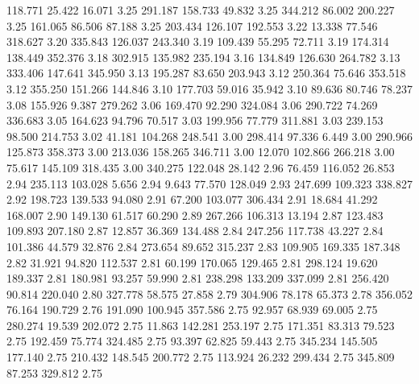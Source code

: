  118.771   25.422   16.071         3.25
 291.187  158.733   49.832         3.25
 344.212   86.002  200.227         3.25
 161.065   86.506   87.188         3.25
 203.434  126.107  192.553         3.22
  13.338   77.546  318.627         3.20
 335.843  126.037  243.340         3.19
 109.439   55.295   72.711         3.19
 174.314  138.449  352.376         3.18
 302.915  135.982  235.194         3.16
 134.849  126.630  264.782         3.13
 333.406  147.641  345.950         3.13
 195.287   83.650  203.943         3.12
 250.364   75.646  353.518         3.12
 355.250  151.266  144.846         3.10
 177.703   59.016   35.942         3.10
  89.636   80.746   78.237         3.08
 155.926    9.387  279.262         3.06
 169.470   92.290  324.084         3.06
 290.722   74.269  336.683         3.05
 164.623   94.796   70.517         3.03
 199.956   77.779  311.881         3.03
 239.153   98.500  214.753         3.02
  41.181  104.268  248.541         3.00
 298.414   97.336    6.449         3.00
 290.966  125.873  358.373         3.00
 213.036  158.265  346.711         3.00
  12.070  102.866  266.218         3.00
  75.617  145.109  318.435         3.00
 340.275  122.048   28.142         2.96
  76.459  116.052   26.853         2.94
 235.113  103.028    5.656         2.94
   9.643   77.570  128.049         2.93
 247.699  109.323  338.827         2.92
 198.723  139.533   94.080         2.91
  67.200  103.077  306.434         2.91
  18.684   41.292  168.007         2.90
 149.130   61.517   60.290         2.89
 267.266  106.313   13.194         2.87
 123.483  109.893  207.180         2.87
  12.857   36.369  134.488         2.84
 247.256  117.738   43.227         2.84
 101.386   44.579   32.876         2.84
 273.654   89.652  315.237         2.83
 109.905  169.335  187.348         2.82
  31.921   94.820  112.537         2.81
  60.199  170.065  129.465         2.81
 298.124   19.620  189.337         2.81
 180.981   93.257   59.990         2.81
 238.298  133.209  337.099         2.81
 256.420   90.814  220.040         2.80
 327.778   58.575   27.858         2.79
 304.906   78.178   65.373         2.78
 356.052   76.164  190.729         2.76
 191.090  100.945  357.586         2.75
  92.957   68.939   69.005         2.75
 280.274   19.539  202.072         2.75
  11.863  142.281  253.197         2.75
 171.351   83.313   79.523         2.75
 192.459   75.774  324.485         2.75
  93.397   62.825   59.443         2.75
 345.234  145.505  177.140         2.75
 210.432  148.545  200.772         2.75
 113.924   26.232  299.434         2.75
 345.809   87.253  329.812         2.75

